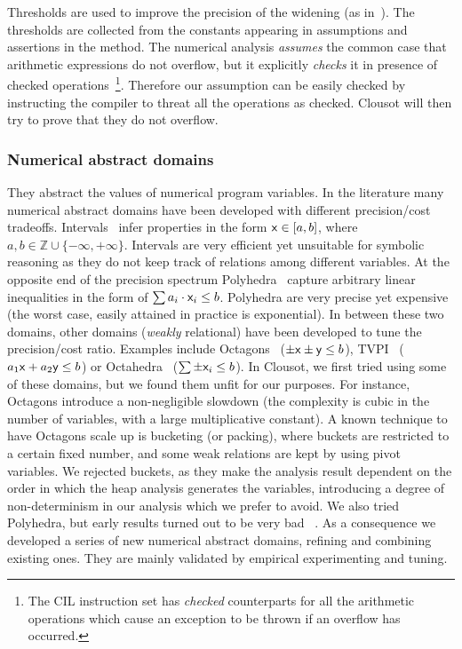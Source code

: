 \documentclass{llncs}
\begin{document}
Thresholds are used to improve the precision of the widening (as in~\cite{astree}).
The thresholds are collected from the constants appearing in assumptions and assertions in the method.
The numerical analysis \emph{assumes} the common case that arithmetic expressions do not overflow, but it explicitly \emph{checks} it in presence of checked operations~\footnote{The CIL instruction set has \emph{checked} counterparts for all the arithmetic operations which cause an exception to be thrown if an overflow has occurred.}.
Therefore our assumption can be easily checked by instructing the compiler to threat all the operations as checked.
Clousot will then try to prove that they do not overflow.


\subsubsection{Numerical abstract domains}
They abstract the values of numerical program variables.  In the
literature many numerical abstract domains have been developed with
different precision/cost tradeoffs.
Intervals~\cite{CousotCousot77-1-POPL} infer properties in the form
$\mathsf{x} \in [a, b]$, where $a,b \in \mathbb{Z} \cup \{-\infty, +\infty
\}$.  Intervals are very efficient yet unsuitable for symbolic
reasoning as they do not keep track of relations among different
variables.  At the opposite end of the precision spectrum
Polyhedra~\cite{CousotHalbwachs78} capture arbitrary linear
inequalities in the form of $\sum a_i \cdot \mathsf{x}_i \leq b$.
Polyhedra are very precise yet expensive (the worst case, easily
attained in practice is exponential).  In between these two domains,
other domains (\emph{weakly} relational) have been developed to tune
the precision/cost ratio.  Examples include
Octagons~\cite{Mine-HOSC06} ($\pm \mathsf{x} \pm \mathsf{y} \leq b$),
TVPI~\cite{SimonKing02} ($a_1 \mathsf{x} + a_2 \mathsf{y} \leq b$) or
Octahedra~\cite{ClarisoCortadella04} ($\sum \pm \mathsf{x}_i \leq b$).  In
Clousot, we first tried using some of these domains, but we found them
unfit for our purposes.  For instance, Octagons introduce a
non-negligible slowdown (the complexity is cubic in the number of
variables, with a large multiplicative constant).  A known technique
to have Octagons scale up is bucketing (or packing), where buckets are
restricted to a certain fixed number, and some weak relations are kept
by using pivot variables.  We rejected buckets, as they make the
analysis result dependent on the order in which the heap analysis
generates the variables, introducing a degree of non-determinism in
our analysis which we prefer to avoid.  We also tried Polyhedra, but
early results turned out to be very bad
~\cite{FerraraLogozzoFahndrich-OOPSLA08}.  As a consequence we
developed a series of new numerical abstract domains, refining and
combining existing ones.  They are mainly validated by empirical
experimenting and tuning.
\end{document}

